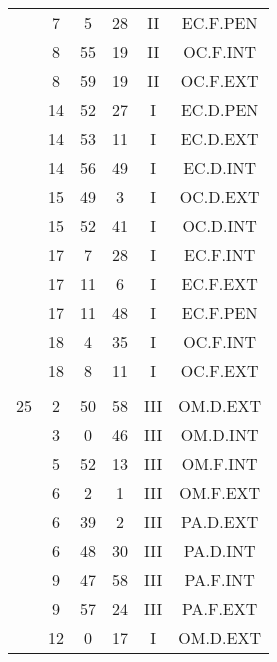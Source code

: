 \documentclass[12pt, a4paper]{article}
\begin{document}
\begin{multicols}{3}
{\begin{tabular}{c c c c c c}
	 	 	 	 & 7 & 5 & 28 & II & EC.F.PEN\\%
	 	 	 	 & 8 & 55 & 19 & II & OC.F.INT\\%
	 	 	 	 & 8 & 59 & 19 & II & OC.F.EXT\\%
	 	 	 	 & 14 & 52 & 27 & I & EC.D.PEN\\%
	 	 	 	 & 14 & 53 & 11 & I & EC.D.EXT\\%
	 	 	 	 & 14 & 56 & 49 & I & EC.D.INT\\%
	 	 	 	 & 15 & 49 & 3 & I & OC.D.EXT\\%
	 	 	 	 & 15 & 52 & 41 & I & OC.D.INT\\%
	 	 	 	 & 17 & 7 & 28 & I & EC.F.INT\\%
	 	 	 	 & 17 & 11 & 6 & I & EC.F.EXT\\%
	 	 	 	 & 17 & 11 & 48 & I & EC.F.PEN\\%
	 	 	 	 & 18 & 4 & 35 & I & OC.F.INT\\%
	 	 	 	 & 18 & 8 & 11 & I & OC.F.EXT\\%
	 	 	 	 & & & & & \\%
	 	 	 	25 & 2 & 50 & 58 & III & OM.D.EXT\\%
	 	 	 	 & 3 & 0 & 46 & III & OM.D.INT\\%
	 	 	 	 & 5 & 52 & 13 & III & OM.F.INT\\%
	 	 	 	 & 6 & 2 & 1 & III & OM.F.EXT\\%
	 	 	 	 & 6 & 39 & 2 & III & PA.D.EXT\\%
	 	 	 	 & 6 & 48 & 30 & III & PA.D.INT\\%
	 	 	 	 & 9 & 47 & 58 & III & PA.F.INT\\%
	 	 	 	 & 9 & 57 & 24 & III & PA.F.EXT\\%
	 	 	 	 & 12 & 0 & 17 & I & OM.D.EXT\\%

\end{tabular}}
\end{multicols}
\end{document}
